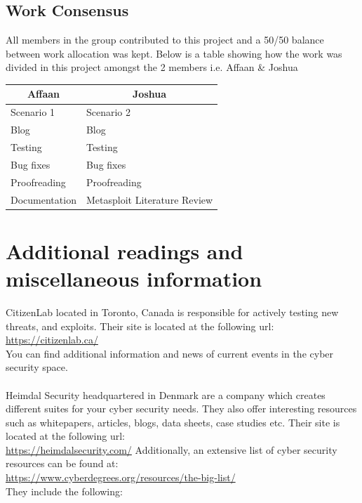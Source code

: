 \documentclass[a4paper, 12pt, titlepage]{report}
\begin{document}
\section{Work Consensus}
All members in the group contributed to this project and a 50/50 balance between work allocation was kept. Below is a table showing how the work was divided in this project amongst the 2 members i.e. Affaan \& Joshua
\begin{table}[H]
\centering
\begin{tabular}{@{}ll@{}}
\toprule
\multicolumn{1}{c}{Affaan}   & \multicolumn{1}{c}{Joshua}         \\ \midrule
Scenario 1     & Scenario 2             \\
Blog & Blog            \\
Testing                      & Testing                            \\
Bug fixes                    & Bug fixes                          \\
Proofreading                        & Proofreading                              \\
Documentation                & Metasploit Literature Review \\ \bottomrule
\end{tabular}
\end{table}
\chapter{Additional readings and miscellaneous information}
CitizenLab located in Toronto, Canada is responsible for actively testing new threats, and exploits. Their site is located at the following url:\\
\url{https://citizenlab.ca/}\\
You can find additional information and news of current events in the cyber security space.\\\\
Heimdal Security headquartered in Denmark are a company which creates different suites for your cyber security needs. They also offer interesting resources such as whitepapers, articles, blogs, data sheets, case studies etc. Their site is located at the following url:\\
\url{https://heimdalsecurity.com/}
Additionally, an extensive list of cyber security resources can be found at:\\
\url{https://www.cyberdegrees.org/resources/the-big-list/}\\
They include the following:
\end{document}
